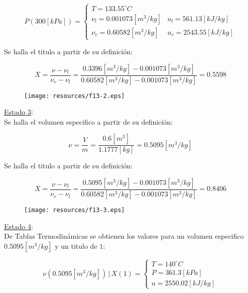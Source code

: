 \documentclass[letter,11pt]{article}
\begin{document}
\begin{enumerate}
\begin{equation*}
    P(300[kPa]) = \begin{cases}
        T = 133.55^\circ C \\
        \nu_l = 0.001073[m^3/kg] & u_l = 561.13[kJ/kg] \\
        \nu_v = 0.60582[m^3/kg]  & u_v = 2543.55[kJ/kg]
    \end{cases}
\end{equation*}

Se halla el titulo a partir de su definición:

\begin{equation*}
    X = \frac{\nu-\nu_l}{\nu_v-\nu_l}
      = \frac{0.3396[m^3/kg] - 0.001073[m^3/kg]}
      {0.60582[m^3/kg] - 0.001073[m^3/kg]}
      = 0.5598
\end{equation*}

\begin{figure}[H]
\centering
\texttt{[image: resources/f13-2.eps]}
\end{figure}

\underline{Estado 3}: \\
Se halla el volumen especifico a partir de su definición:

\begin{equation*}
    \nu = \frac{V}{m} = \frac{0.6[m^3]}{1.1777[kg]} = 0.5095[m^3/kg]
\end{equation*}

Se halla el titulo a partir de su definición:

\begin{equation*}
    X = \frac{\nu-\nu_l}{\nu_v-\nu_l}
      = \frac{0.5095[m^3/kg] - 0.001073[m^3/kg]}
      {0.60582[m^3/kg] - 0.001073[m^3/kg]}
      = 0.8406
\end{equation*}

\begin{figure}[H]
\centering
\texttt{[image: resources/f13-3.eps]}
\end{figure}

\underline{Estado 4}: \\
De Tablas Termodinámicas se obtienen los valores para un volumen especifico
$0.5095[m^3/kg]$ y un titulo de $1$:

\begin{equation*}
    \nu(0.5095[m^3/kg])\,|\,X(1) = \begin{cases}
        T = 140^\circ C \\
        P = 361.3[kPa] \\
        u = 2550.02[kJ/kg]
    \end{cases}
\end{equation*}


\end{enumerate}
\end{document}
